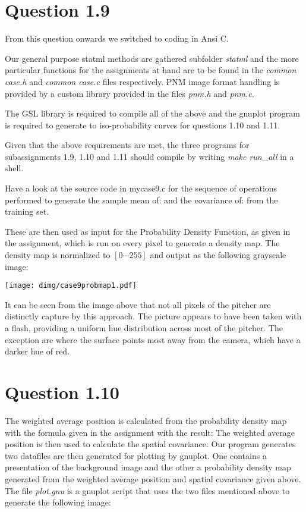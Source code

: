 \section*{Question 1.9}
From this question onwards we switched to coding in Ansi C. 

Our general purpose statml methods are gathered subfolder \textit{statml} and the more particular functions for the assignments at hand are to be found in the \textit{common case.h} and \textit{common case.c} files respectively.
PNM image format handling is provided by a custom library provided in the files \textit{pnm.h} and  \textit{pnm.c}.

The GSL library is required to compile all of the above and the gnuplot program is required to generate to iso-probability curves for questions 1.10 and 1.11.

Given that the above requirements are met, the three programs for subassignments 1.9, 1.10 and 1.11 should compile by writing \textit{make run\_all} in a shell.

Have a look at the source code in mycase9.c for the sequence of operations performed to generate the sample mean of:
\cninesmean{}
and the covariance of:
\cninescov{}
from the training set.

These are then used as input for the Probability Density Function, as given in the assignment, which is run on every pixel to generate a density map. The density map is normalized to $[0\cdots255]$ and output as the following grayscale image:
\begin{center}
\texttt{[image: dimg/case9probmap1.pdf]}
\end{center}
It can be seen from the image above that not all pixels of the pitcher are distinctly capture by this approach. The picture appears to have been taken with a flash, providing a uniform hue distribution across most of the pitcher. The exception are where the surface points most away from the camera, which have a darker hue of red.

\section*{Question 1.10}
The weighted average position is calculated from the probability density map with the formula given in the assignment with the result:
\ctenwmean{}
The weighted average position is then used to calculate the spatial covariance:
\ctenwcov{}
Our program generates two datafiles are then generated for plotting by gnuplot. One  contains a presentation of the background image and the other a probability density map generated from the weighted average position and spatial covariance given above. The file \textit{plot.gnu} is a gnuplot script that uses the two files mentioned above to generate the following image:

